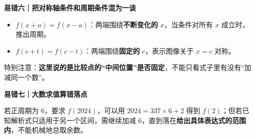 \clearpage
\begin{trapbox}
\textbf{\textcolor{CTrap}{易错六｜把对称轴条件和周期条件混为一谈}}



\begin{itemize}[leftmargin=*,itemsep=.3em]
\item $f(x+a)=f(x-a)$：两端围绕\textbf{不断变化的} $x$，当条件对所有 $x$ 成立时，推出周期。
\item $f(c+t)=f(c-t)$：两端围绕\textbf{固定的} $c$，表示图像关于 $x=c$ 对称。
\end{itemize}
特别注意：\textbf{这里说的是比较点的“中间位置”是否固定}，不能只看式子里有没有“加减同一个数”。

\medskip

\end{trapbox}
\clearpage
\begin{trapbox}
\textbf{\textcolor{CTrap}{易错七｜大数求值算错落点}}



若正周期为 $6$，要求 $f(2024)$，可以用 $2024=337\times6+2$ 得到 $f(2)$；但若已知解析式只适用于另一个区间，需继续加减 $6$，直到落在\textbf{给出具体表达式的范围内}，不能机械地总取余数。
\end{trapbox}
